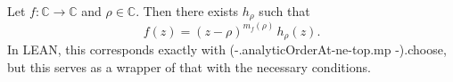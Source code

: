 \begin{definition}[ZeroFactor]
\label{ZeroFactor}
\leanok
Let $f:\mathbb{C}\to\mathbb{C}$ and $\rho\in\mathbb{C}$. Then there exists $h_\rho$ such that
    $$f(z)=(z-\rho)^{m_f(\rho)}\,h_\rho(z).$$
    In LEAN, this corresponds exactly with (-.analyticOrderAt-ne-top.mp -).choose,
    but this serves as a wrapper of that with the necessary conditions.
\end{definition}
